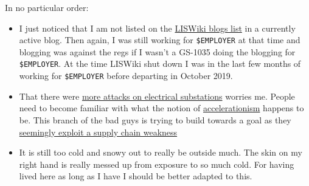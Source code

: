 In no particular order:

\begin{itemize}
\tightlist
\item
  I just noticed that I am not listed on the
  \href{https://liswiki.org/wiki/Weblogs}{LISWiki blogs list} in a
  currently active blog. Then again, I was still working for
  \texttt{\$EMPLOYER} at that time and blogging was against the regs if
  I wasn't a GS-1035 doing the blogging for \texttt{\$EMPLOYER}. At the
  time LISWiki shut down I was in the last few months of working for
  \texttt{\$EMPLOYER} before departing in October 2019.
\item
  That there were
  \href{https://www.msn.com/en-us/news/us/power-substations-vandalized-in-washington-state-weeks-after-north-carolina-electricity-attack-and-fbi-warning/ar-AA15F9fW}{more
  attacks on electrical substations} worries me. People need to become
  familiar with what the notion of
  \href{https://www.hsdl.org/c/abstract/?docid=852447}{accelerationism}
  happens to be. This branch of the bad guys is trying to build towards
  a goal as they
  \href{https://www.hsdl.org/c/abstract/?docid=873177}{seemingly exploit
  a supply chain weakness}
\item
  It is still too cold and snowy out to really be outside much. The skin
  on my right hand is really messed up from exposure to so much cold.
  For having lived here as long as I have I should be better adapted to
  this.
\end{itemize}
